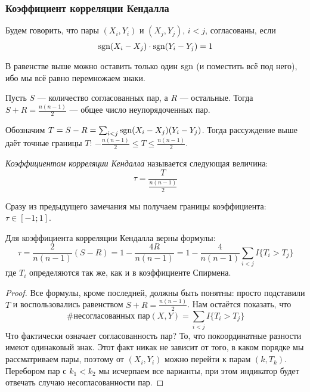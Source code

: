 \subsubsection*{Коэффициент корреляции Кендалла}

\begin{definition}
	Будем говорить, что пары $(X_i, Y_i)$ и $(X_j, Y_j)$, $i < j$, согласованы, если
	\[
		\operatorname{sgn}(X_i - X_j) \cdot \operatorname{sgn}(Y_i - Y_j) = 1
	\]
\end{definition}

\begin{note}
	В равенстве выше можно оставить только один $\operatorname{sgn}$ (и поместить всё под него), ибо мы всё равно перемножаем знаки.
\end{note}

\begin{note}
	Пусть $S$ --- количество согласованных пар, а $R$ --- остальные. Тогда $S + R = \frac{n(n - 1)}{2}$ --- общее число неупорядоченных пар.
	
	Обозначим $T = S - R = \sum_{i < j} \operatorname{sgn}(X_i - X_j)(Y_i - Y_j)$. Тогда рассуждение выше даёт точные границы $T$: $-\frac{n(n - 1)}{2} \le T \le \frac{n(n - 1)}{2}$.
\end{note}

\begin{definition}
	\textit{Коэффициентом корреляции Кендалла} называется следующая величина:
	\[
		\tau = \frac{T}{\frac{n(n - 1)}{2}}
	\]
\end{definition}

\begin{note}
	Сразу из предыдущего замечания мы получаем границы коэффициента: $\tau \in [-1; 1]$.
\end{note}

\begin{proposition}
	Для коэффициента корреляции Кендалла верны формулы:
	\[
		\tau = \frac{2}{n(n - 1)}(S - R) = 1 - \frac{4R}{n(n - 1)} = 1 - \frac{4}{n(n - 1)}\sum_{i < j} I\{T_i > T_j\}
	\]
	где $T_i$ определяются так же, как и в коэффициенте Спирмена.
\end{proposition}

\begin{proof}
	Все формулы, кроме последней, должны быть понятны: просто подставили $T$ и воспользовались равенством $S + R = \frac{n(n - 1)}{2}$. Нам остаётся показать, что
	\[
		\text{\#несогласованных пар}(X, Y) = \sum_{i < j} I\{T_i > T_j\}
	\]
	Что фактически означает согласованность пар? То, что покоординатные разности имеют одинаковый знак. Этот факт никак не зависит от того, в каком порядке мы рассматриваем пары, поэтому от $(X_i, Y_i)$ можно перейти к парам $(k, T_k)$. Перебором пар с $k_1 < k_2$ мы исчерпаем все варианты, при этом индикатор будет отвечать случаю несогласованности пар.
\end{proof}

